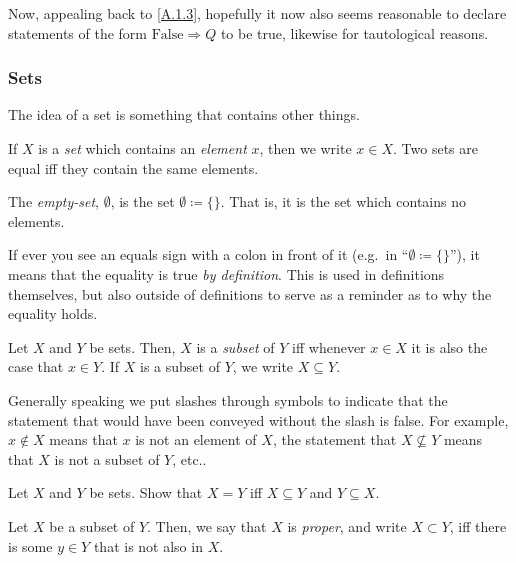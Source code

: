 Now, appealing back to \eqref{A.1.3}, hopefully it now also seems reasonable to declare statements of the form $\text{False}\Rightarrow Q$ to be true, likewise for tautological reasons.

\subsubsection{Sets}

The idea of a set is something that contains other things.
\begin{textequation}
If $X$ is a \emph{set} which contains an \emph{element} $x$, then we write $x\in X$.  Two sets are equal iff they contain the same elements.
\end{textequation}
\begin{dfn}
The \emph{empty-set}, $\emptyset$, is the set $\emptyset \coloneqq \{ \}$.  That is, it is the set which contains no elements.
\end{dfn}
\begin{rmk}
If ever you see an equals sign with a colon in front of it (e.g.~in ``$\emptyset \coloneqq \{ \}$''), it means that the equality is true \emph{by definition}.  This is used in definitions themselves, but also outside of definitions to serve as a reminder as to why the equality holds.\index[notation]{$\coloneqq $}
\end{rmk}
\begin{dfn}[Subset]
Let $X$ and $Y$ be sets.  Then, $X$ is a \emph{subset} of $Y$ iff whenever $x\in X$ it is also the case that $x\in Y$.  If $X$ is a subset of $Y$, we write $X\subseteq Y$.
\end{dfn}
\begin{rmk}
Generally speaking we put slashes through symbols to indicate that the statement that would have been conveyed without the slash is false.  For example, $x\notin X$ means that $x$ is not an element of $X$, the statement that $X\not \subseteq Y$ means that $X$ is not a subset of $Y$, etc..
\end{rmk}
\begin{exr}
Let $X$ and $Y$ be sets.  Show that $X=Y$ iff $X\subseteq Y$ and $Y\subseteq X$.
\end{exr}
\begin{dfn}
Let $X$ be a subset of $Y$.  Then, we say that $X$ is \emph{proper}, and write $X\subset Y$, iff there is some $y\in Y$ that is not also in $X$.
\end{dfn}
